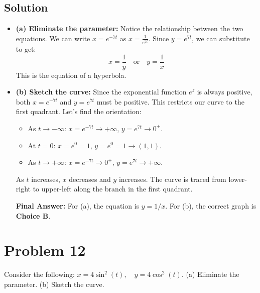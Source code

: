 \documentclass{article}
\begin{document}
\subsection*{Solution}
\begin{itemize}
    \item \textbf{(a) Eliminate the parameter:}
    Notice the relationship between the two equations. We can write $x = e^{-7t}$ as $x = \frac{1}{e^{7t}}$.
    Since $y = e^{7t}$, we can substitute to get:
    \[ x = \frac{1}{y} \quad \text{or} \quad y = \frac{1}{x} \]
    This is the equation of a hyperbola.

    \item \textbf{(b) Sketch the curve:}
    Since the exponential function $e^z$ is always positive, both $x=e^{-7t}$ and $y=e^{7t}$ must be positive. This restricts our curve to the first quadrant.
    Let's find the orientation:
    \begin{itemize}
        \item As $t \to -\infty$: $x=e^{-7t} \to +\infty$, $y=e^{7t} \to 0^+$.
        \item At $t = 0$: $x=e^0=1$, $y=e^0=1 \rightarrow (1, 1)$.
        \item As $t \to +\infty$: $x=e^{-7t} \to 0^+$, $y=e^{7t} \to +\infty$.
    \end{itemize}
    As $t$ increases, $x$ decreases and $y$ increases. The curve is traced from lower-right to upper-left along the branch in the first quadrant.

    \textbf{Final Answer:} For (a), the equation is $y=1/x$. For (b), the correct graph is \textbf{Choice B}.
\end{itemize}

\section{Problem 12}
Consider the following: $x = 4 \sin^2(t), \quad y = 4 \cos^2(t)$.
(a) Eliminate the parameter.
(b) Sketch the curve.
\end{document}
